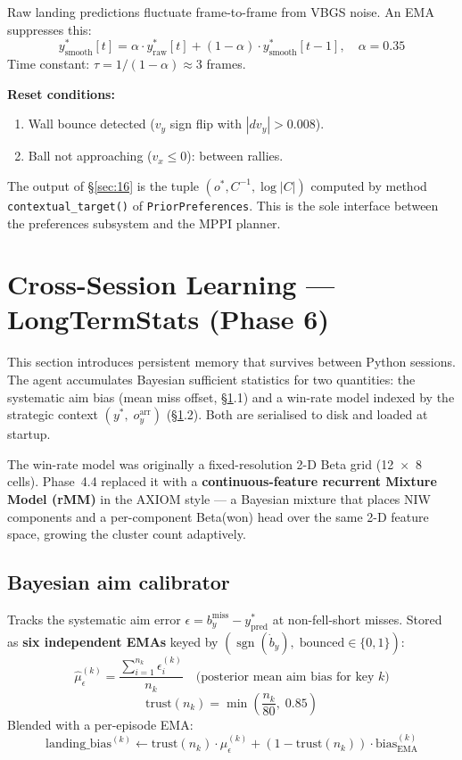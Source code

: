 \documentclass[12pt, a4paper]{article}
\newcommand{\1}{\mathbf{1}}
\newcommand{\sgn}{\operatorname{sgn}}
\newcommand{\code}[1]{\texttt{#1}}
\begin{document}
Raw landing predictions fluctuate frame-to-frame from VBGS noise.  An EMA
suppresses this:
\[
y^*_\text{smooth}[t]
= \alpha \cdot y^*_\text{raw}[t] + (1-\alpha) \cdot y^*_\text{smooth}[t-1],
\quad \alpha = 0.35
\]
Time constant: $\tau = 1/(1-\alpha) \approx 3$ frames.

\textbf{Reset conditions:}
\begin{enumerate}
  \item Wall bounce detected ($v_y$ sign flip with $|dv_y| > 0.008$).
  \item Ball not approaching ($v_x \le 0$): between rallies.
\end{enumerate}

The output of \S\ref{sec:16} is the tuple $(o^*, C^{-1}, \log|C|)$ computed by
method \code{contextual\_target()} of \code{PriorPreferences}.
This is the sole interface between the preferences subsystem and the MPPI planner.

\section{Cross-Session Learning --- LongTermStats (Phase 6)}
\label{sec:17}

This section introduces persistent memory that survives between Python sessions.
The agent accumulates Bayesian sufficient statistics for two quantities: the
systematic aim bias (mean miss offset, \S\ref{sec:17}.1) and a win-rate model
indexed by the strategic context $(y^*,\; o_y^\text{arr})$ (\S\ref{sec:17}.2).
Both are serialised to disk and loaded at startup.

The win-rate model was originally a fixed-resolution 2-D Beta grid
(12~$\times$~8 cells).  Phase~4.4 replaced it with a
\textbf{continuous-feature recurrent Mixture Model (rMM)} in the AXIOM style ---
a Bayesian mixture that places NIW components and a per-component Beta(won) head
over the same 2-D feature space, growing the cluster count adaptively.

\subsection{Bayesian aim calibrator}

Tracks the systematic aim error
$\epsilon = b_y^\text{miss} - y^*_\text{pred}$ at non-fell-short misses.
Stored as \textbf{six independent EMAs} keyed by
$(\sgn(\dot b_y),\; \text{bounced} \in \{0,1\})$:
\[
\hat\mu_\epsilon^{(k)}
= \frac{\sum_{i=1}^{n_k} \epsilon_i^{(k)}}{n_k}
\quad\text{(posterior mean aim bias for key }k\text{)}
\]
\[
\text{trust}(n_k) = \min\!\left(\frac{n_k}{80},\; 0.85\right)
\]
Blended with a per-episode EMA:
\[
\text{landing\_bias}^{(k)}
\leftarrow
\text{trust}(n_k) \cdot \hat\mu_\epsilon^{(k)}
+ (1 - \text{trust}(n_k)) \cdot \text{bias}_\text{EMA}^{(k)}
\]
\end{document}
